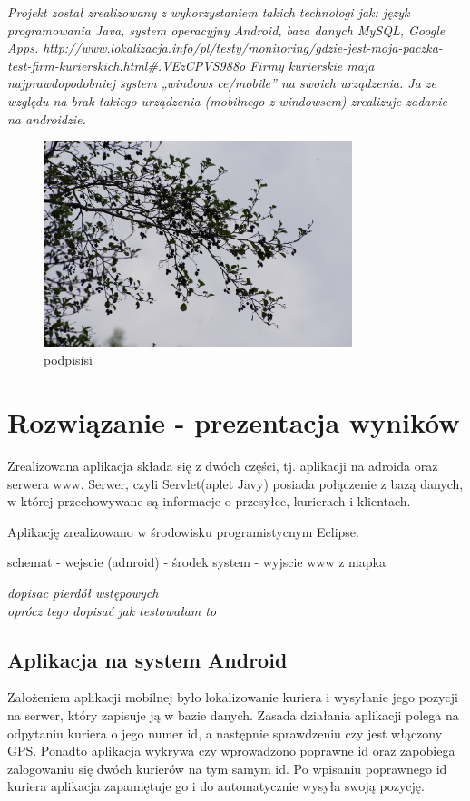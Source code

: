 \documentclass[eng,printmode,oneside]{mgr}
\begin{document}
\emph{\color{komentarz}
Projekt został zrealizowany z wykorzystaniem takich
technologi jak:
język programowania Java, system operacyjny Android, baza danych MySQL, Google Apps.
http://www.lokalizacja.info/pl/testy/monitoring/gdzie-jest-moja-paczka-test-firm-kurierskich.html\#.VEzCPVS988o
Firmy kurierskie maja najprawdopodobniej system „windows ce/mobile” na swoich urządzenia. Ja ze względu na brak takiego urządzenia (mobilnego z windowsem) 
zrealizuje zadanie na androidzie.
}

\begin{figure}[ht!]
\centering
\includegraphics[width=90mm]{obr.jpg}
\caption{podpisisi}
\end{figure}
\chapter{Rozwiązanie - prezentacja wyników}


Zrealizowana aplikacja składa się z dwóch części, tj. aplikacji na adroida oraz
serwera www. Serwer, czyli Servlet(aplet Javy) posiada połączenie z bazą
danych, w której przechowywane są informacje o przesyłce, kurierach i
klientach. 

Aplikację zrealizowano w środowisku programistycnym Eclipse.

schemat - wejscie (adnroid) - środek system - wyjscie www z mapka

\emph{\color{komentarz} dopisac pierdół wstępowych\\oprócz tego dopisać jak
testowałam to}
\section{Aplikacja na system Android}


Założeniem aplikacji mobilnej było lokalizowanie kuriera i wysyłanie jego
pozycji na serwer, który zapisuje ją w bazie danych.
Zasada działania aplikacji polega na odpytaniu kuriera o jego numer id, a
następnie sprawdzeniu czy jest włączony GPS. Ponadto aplikacja wykrywa czy
wprowadzono poprawne id oraz zapobiega zalogowaniu się dwóch kurierów na tym
samym id. Po wpisaniu poprawnego id kuriera aplikacja zapamiętuje go i do
automatycznie wysyła swoją pozycję.
\end{document}
